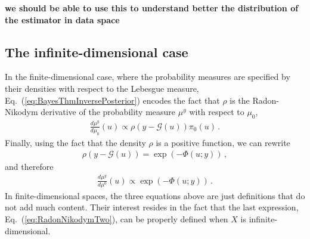 {\bf we should be able to use this to understand better the distribution of the estimator in data space} 


\subsection{The infinite-dimensional case}
\label{sec:infin-dimens-case}

In the finite-dimensional case, where the probability measures are
specified by their densities with respect to the Lebesgue measure,
Eq.~(\ref{eq:BayesThmInversePosterior}) encodes the fact that $\rho$
is the Radon-Nikodym derivative of the probability measure $\mu^y$
with respect to $\mu_0$, \viz
\begin{align}
  \label{eq:RadonNikodym}
  \frac{d\mu^y}{d\mu_0} (u) \propto \rho(y-\mathcal G(u)) \pi_0(u)\, .
\end{align}
Finally, using the fact that the density $\rho$ is a positive
function, we can rewrite 
\begin{align}
  \label{eq:PotentialDef}
  \rho(y-\mathcal G(u)) = \exp\left(-\Phi(u;y)\right)\, ,
\end{align}
and therefore
\begin{align}
  \label{eq:RadonNikodymTwo}
  \frac{d\mu^y}{d\mu^0} (u) \propto \exp\left(-\Phi(u;y)\right)\, .
\end{align}
In finite-dimensional spaces, the three equations above are just
definitions that do not add much content. Their interest resides in
the fact that the last expression, Eq.~(\ref{eq:RadonNikodymTwo}), can
be properly defined when $X$ is infinite-dimensional.

